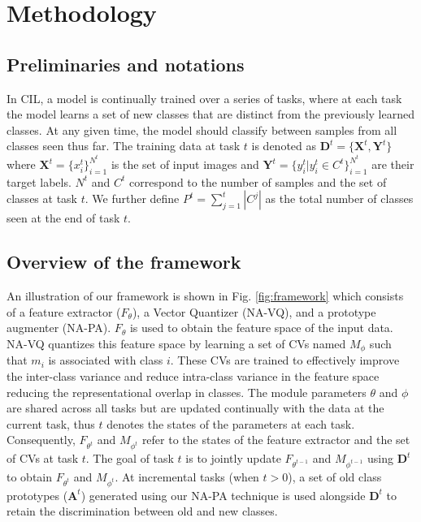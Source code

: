\documentclass[10pt,twocolumn,letterpaper]{article}
\begin{document}
\section{Methodology}


\subsection{Preliminaries and notations}
In CIL, a model is continually trained over a series of tasks, where at each task the model learns a set of new classes that are distinct from the previously learned classes. At any given time, the model should classify between samples from all classes seen thus far. The training data at task $t$ is denoted as $\mathbf{D}^{t} = \{\mathbf{X}^{t}, \mathbf{Y}^{t}\}$ 
where $\mathbf{X}^{t} = \{x^t_i\}_{i=1}^{N^t}$ is the set of input images and $\mathbf{Y}^{t} = \{y^t_i| y^t_i \in C^t\}_{i=1}^{N^t}$  are their target labels. ${N^t}$ and $C^t$ correspond to the number of samples and the set of classes at task $t$. We further define $ P^t = \sum_{j=1}^{t}|C^j|$ as the total number of classes seen at the end of task $t$.

\subsection{Overview of the framework}

An illustration of our framework is shown in Fig. \ref{fig:framework} which consists of a feature extractor ($F_{\theta}$), a Vector Quantizer (NA-VQ), and a prototype augmenter (NA-PA). $F_{\theta}$ is used to obtain the feature space of the input data. NA-VQ quantizes this feature space by learning a set of CVs named $M_{\phi}$ such that $m_i$ is associated with class $i$. These CVs are trained to effectively improve the inter-class variance and reduce intra-class variance in the feature space reducing the representational overlap in classes.
The module parameters $\theta$ and $\phi$ are shared across all tasks but are updated continually with the data at the current task, thus $t$ denotes the states of the parameters at each task.
Consequently, $F_{\theta^t}$ and $M_{\phi^t}$ refer to the states of the feature extractor and the set of CVs at task $t$.
The goal of task $t$ is to jointly update $F_{\theta^{t-1}}$ and $M_{\phi^{t-1}}$ using $\mathbf{D}^{t}$ to obtain $F_{\theta^t}$ and $M_{\phi^t}$. At incremental tasks (when $t>0$), a set of old class prototypes ($\mathbf{A}^t$) generated using our NA-PA technique is used alongside $\mathbf{D}^t$ to retain the discrimination between old and new classes.
\end{document}
